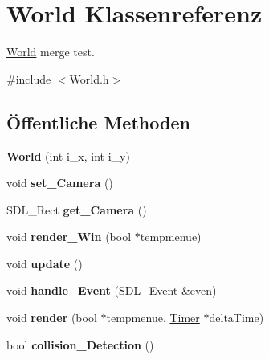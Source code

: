 \hypertarget{class_world}{\section{World Klassenreferenz}
\label{class_world}
}


\hyperlink{class_world}{World} merge test.  




{\ttfamily \#include $<$World.\-h$>$}

\subsection*{Öffentliche Methoden}
\begin{DoxyCompactItemize}
\item 
\hypertarget{class_world_a223764f33284a2f1f0bf647ffb210759}{{\bfseries World} (int i\-\_\-x, int i\-\_\-y)}\label{class_world_a223764f33284a2f1f0bf647ffb210759}

\item 
\hypertarget{class_world_a149a22406179d656aea426c32577bed9}{void {\bfseries set\-\_\-\-Camera} ()}\label{class_world_a149a22406179d656aea426c32577bed9}

\item 
\hypertarget{class_world_ae55ead4b6828a5f2b3a6d93e8c947c97}{S\-D\-L\-\_\-\-Rect {\bfseries get\-\_\-\-Camera} ()}\label{class_world_ae55ead4b6828a5f2b3a6d93e8c947c97}

\item 
\hypertarget{class_world_a9164eb25c327d3c1153deb6a6fd89a83}{void {\bfseries render\-\_\-\-Win} (bool $\ast$tempmenue)}\label{class_world_a9164eb25c327d3c1153deb6a6fd89a83}

\item 
\hypertarget{class_world_aac8c1fde63c06577ffc648aaefdb37f0}{void {\bfseries update} ()}\label{class_world_aac8c1fde63c06577ffc648aaefdb37f0}

\item 
\hypertarget{class_world_a6e9d1717aae39babd17d801a7de6486d}{void {\bfseries handle\-\_\-\-Event} (S\-D\-L\-\_\-\-Event \&even)}\label{class_world_a6e9d1717aae39babd17d801a7de6486d}

\item 
\hypertarget{class_world_a15a2d4bb5a4f26400a6c1365d8eb4875}{void {\bfseries render} (bool $\ast$tempmenue, \hyperlink{class_timer}{Timer} $\ast$delta\-Time)}\label{class_world_a15a2d4bb5a4f26400a6c1365d8eb4875}

\item 
\hypertarget{class_world_ae324f881eae678d166eb81321dc8cbab}{bool {\bfseries collision\-\_\-\-Detection} ()}\label{class_world_ae324f881eae678d166eb81321dc8cbab}


\end{DoxyCompactItemize}
